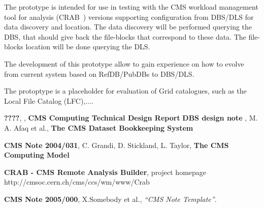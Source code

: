 \documentclass[pdftex]{cmspaper}
\begin{document}
   
   The prototype is intended for use in testing with the CMS workload 
   management tool for analysis (CRAB~\cite{CRAB}) versions supporting 
   configuration from DBS/DLS for data discovery and location.
   The data discovery will be performed querying the DBS, that
   should give back the file-blocks that correspond to these data.
   The file-blocks location will be done querying the DLS.

   The development of this prototype allow to gain experience on 
   how to evolve from current system based on RefDB/PubDBs
   to DBS/DLS.

   The protoptype is a placeholder for evaluation of Grid catalogues,
   such as the Local File Catalog (LFC),.... 
 

\begin{thebibliography}{9}
   {\bf ????}, , {\bf CMS Computing Technical Design Report}
   {\bf DBS design note }, M. A. Afaq et al., 
    {\bf The CMS Dataset Bookkeeping System}

   {\bf CMS Note 2004/031}, C. Grandi, D. Stickland,
               L. Taylor, {\bf The CMS Computing Model}

   {\bf CRAB - CMS Remote Analysis Builder}, project homepage
               http://cmsoc.cern.ch/cms/ccs/wm/www/Crab

   {\bf CMS Note 2005/000},
    X.Somebody et al.,
    {\em ``CMS Note Template''}.
\end{thebibliography}
 
\pagebreak
\end{document}
